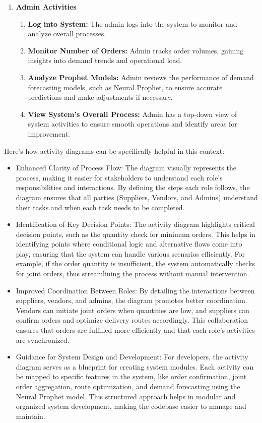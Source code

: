 \begin{enumerate}
    \item \textbf{Admin Activities}
    \begin{enumerate}
        \item \textbf{Log into System:} The admin logs into the system to monitor and analyze overall processes.
        \item \textbf{Monitor Number of Orders:} Admin tracks order volumes, gaining insights into demand trends and operational load.
        \item \textbf{Analyze Prophet Models:} Admin reviews the performance of demand forecasting models, such as Neural Prophet, to ensure accurate predictions and make adjustments if necessary.
        \item \textbf{View System's Overall Process:} Admin has a top-down view of system activities to ensure smooth operations and identify areas for improvement.
    \end{enumerate}
\end{enumerate}


Here’s how activity diagrams can be specifically helpful in this context:
\begin{itemize}
\item Enhanced Clarity of Process Flow: The diagram visually represents the process, making it easier for stakeholders to understand each role's responsibilities and interactions. By defining the steps each role follows, the diagram ensures that all parties (Suppliers, Vendors, and Admins) understand their tasks and when each task needs to be completed.
\item Identification of Key Decision Points: The activity diagram highlights critical decision points, such as the quantity check for minimum orders. This helps in identifying points where conditional logic and alternative flows come into play, ensuring that the system can handle various scenarios efficiently. For example, if the order quantity is insufficient, the system automatically checks for joint orders, thus streamlining the process without manual intervention.
\item Improved Coordination Between Roles: By detailing the interactions between suppliers, vendors, and admins, the diagram promotes better coordination. Vendors can initiate joint orders when quantities are low, and suppliers can confirm orders and optimize delivery routes accordingly. This collaboration ensures that orders are fulfilled more efficiently and that each role's activities are synchronized.
\item Guidance for System Design and Development: For developers, the activity diagram serves as a blueprint for creating system modules. Each activity can be mapped to specific features in the system, like order confirmation, joint order aggregation, route optimization, and demand forecasting using the Neural Prophet model. This structured approach helps in modular and organized system development, making the codebase easier to manage and maintain.
\end{itemize}
